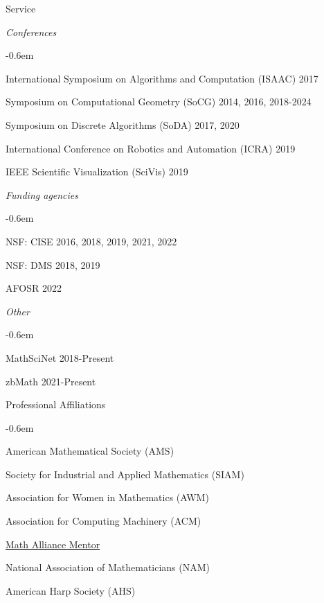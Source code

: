\documentclass{resume} %
\begin{document}
\begin{rSection}{Service}
\begin{list}{}{\leftmargin=1em}
\end{list}
\textit{Conferences}
\begin{list}{}{\leftmargin=1em}
   \itemsep -0.6em \vspace{-0.5em} %
   \item International Symposium on Algorithms and Computation (ISAAC) \hfill 2017
   \item Symposium on Computational Geometry (SoCG) \hfill 2014, 2016, 2018-2024
   \item Symposium on Discrete Algorithms (SoDA) \hfill 2017, 2020
   \item International Conference on Robotics and Automation (ICRA) \hfill 2019
   \item IEEE Scientific Visualization (SciVis) \hfill 2019
\end{list}
\textit{Funding agencies}
\begin{list}{}{\leftmargin=1em}
   \itemsep -0.6em \vspace{-0.5em} %
   \item NSF: CISE  \hfill 2016, 2018, 2019, 2021, 2022
   \item NSF: DMS \hfill 2018, 2019
   \item AFOSR \hfill 2022
\end{list}
\textit{Other}
\begin{list}{}{\leftmargin=1em}
   \itemsep -0.6em \vspace{-0.5em} %
   \item MathSciNet \hfill 2018-Present
   \item zbMath \hfill 2021-Present
\end{list}

\end{rSection}
\begin{rSection}{Professional Affiliations}

\begin{list}{}{\leftmargin=0em}
   \itemsep -0.6em %
 \item American Mathematical Society (AMS)
 \item Society for Industrial and Applied Mathematics (SIAM)
 \item Association for Women in Mathematics (AWM)
 \item Association for Computing Machinery (ACM)
 \item \href{https://mathalliance.org/mentor/liz-munch/}{Math Alliance Mentor}
 \item National Association of Mathematicians (NAM)
 \item American Harp Society (AHS)
\end{list}


\end{rSection}
\end{document}
